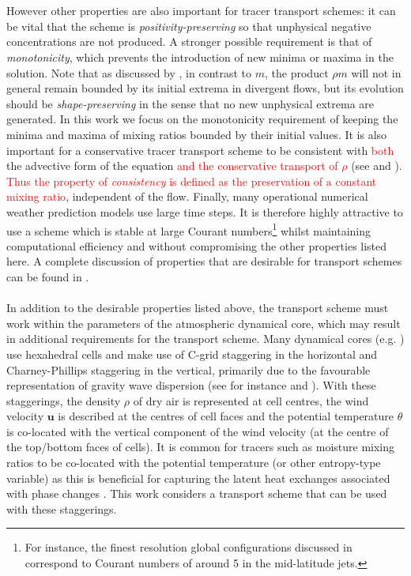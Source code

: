 \documentclass{ametsocV6.1}
\newcommand{\change}[1]{\textcolor{red}{#1}}
\begin{document}
\\
\\
However other properties are also important for tracer transport schemes: it can be vital that the scheme is \textit{positivity-preserving} so that unphysical negative concentrations are not produced.
A stronger possible requirement is that of \textit{monotonicity}, which prevents the introduction of new minima or maxima in the solution.
Note that as discussed by \citet{lauritzen2011numerical}, in contrast to $m$, the product $\rho m$ will not in general remain bounded by its initial extrema in divergent flows, but its evolution should be \textit{shape-preserving} in the sense that no new unphysical extrema are generated.
In this work we focus on the monotonicity requirement of keeping the minima and maxima of mixing ratios bounded by their initial values.
It is also important for a conservative tracer transport scheme to be consistent with \change{both} the advective form of the equation \change{and the conservative transport of $\rho$} (see \citep{jockel2001fundamental} and \citep{zhang2008consistency}).
\change{Thus the property of \textit{consistency} is defined as the preservation of a constant mixing ratio}, independent of the flow.
Finally, many operational numerical weather prediction models use large time steps.
It is therefore highly attractive to use a scheme which is stable at large Courant numbers\footnote{For instance, the finest resolution global configurations discussed in \citet{walters2019met} correspond to Courant numbers of around 5 in the mid-latitude jets.}
whilst maintaining computational efficiency and without compromising the other properties listed here.
A complete discussion of properties that are desirable for transport schemes can be found in \citet{lauritzen2011numerical}.
\\
\\
In addition to the desirable properties listed above, the transport scheme must work within the parameters of the atmospheric dynamical core, which may result in additional requirements for the transport scheme.
Many dynamical cores (e.g. \citep{chen2008new,wood2014inherently,girard2014staggered,melvin2024mixed}) use hexahedral cells and make use of C-grid staggering in the horizontal and Charney-Phillips staggering \citep{charney1953verticalstaggering} in the vertical, primarily due to the favourable representation of gravity wave dispersion (see for instance \citet{staniforth2012horizontal} and \citet{thuburn2022numerical}). 
With these staggerings, the density $\rho$ of dry air is represented at cell centres, the wind velocity $\bm{u}$ is described at the centres of cell faces and the potential temperature $\theta$ is co-located with the vertical component of the wind velocity (at the centre of the top/bottom faces of cells).
It is common for tracers such as moisture mixing ratios to be co-located with the potential temperature (or other entropy-type variable) as this is beneficial for capturing the latent heat exchanges associated with phase changes \citep{bendall2023solution}.
This work considers a transport scheme that can be used with these staggerings.
\end{document}

